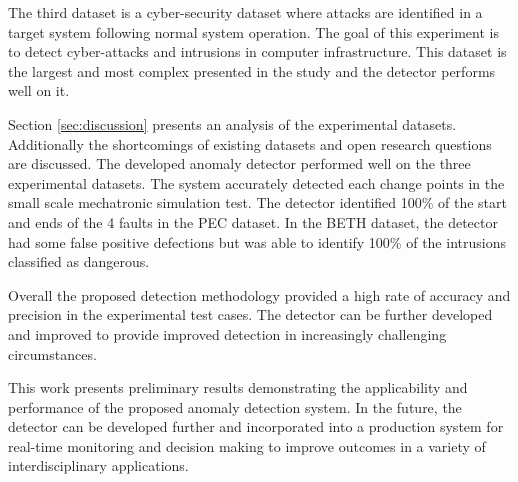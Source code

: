 The third dataset is a cyber-security dataset where attacks are identified in a target system following normal system operation.
The goal of this experiment is to detect cyber-attacks and intrusions in computer infrastructure.
This dataset is the largest and most complex presented in the study and the detector performs well on it.

Section \ref{sec:discussion} presents an analysis of the experimental datasets.
Additionally the shortcomings of existing datasets and open research questions are discussed.
The developed anomaly detector performed well on the three experimental datasets.
The system accurately detected each change points in the small scale mechatronic simulation test.
The detector identified 100\% of the start and ends of the 4 faults in the PEC dataset.
In the BETH dataset, the detector had some false positive defections but was able to identify 100\% of the intrusions classified as dangerous.

Overall the proposed detection methodology provided a high rate of accuracy and precision in the experimental test cases.
The detector can be further developed and improved to provide improved detection in increasingly challenging circumstances.

This work presents preliminary results demonstrating the applicability and performance of the proposed anomaly detection system.
In the future, the detector can be developed further and incorporated into a production system for real-time monitoring and decision making to improve outcomes in a variety of interdisciplinary applications. 

